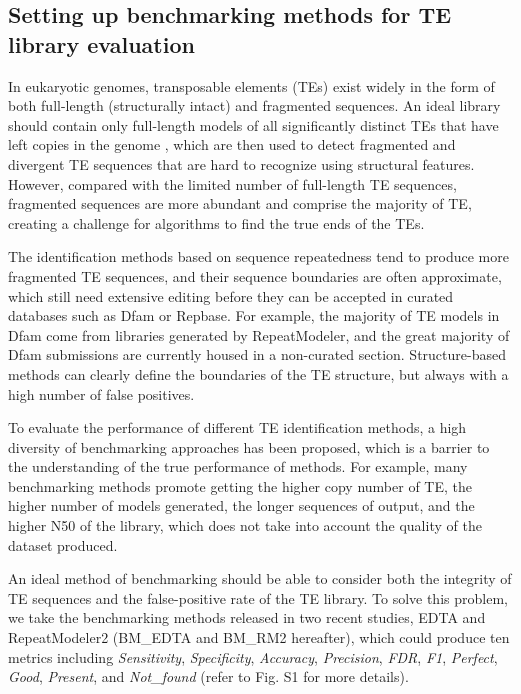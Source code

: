 \documentclass{bmcart}
\begin{document}
\subsection*{Setting up benchmarking methods for TE library evaluation}
In eukaryotic genomes, transposable elements (TEs) exist widely in the form of both full-length (structurally intact) and fragmented sequences. An ideal library should contain only full-length models of all significantly distinct TEs that have left copies in the genome \cite{storer2022methodologies}, which are then used to detect fragmented and divergent TE sequences that are hard to recognize using structural features. However, compared with the limited number of full-length TE sequences, fragmented sequences are more abundant and comprise the majority of TE, creating a challenge for algorithms to find the true ends of the TEs.

The identification methods based on sequence repeatedness tend to produce more fragmented TE sequences, and their sequence boundaries are often approximate, which still need extensive editing before they can be accepted in curated databases such as Dfam or Repbase. For example, the majority of TE models in Dfam come from libraries generated by RepeatModeler, and the great majority of Dfam submissions are currently housed in a non-curated section\cite{storer2021dfam}. Structure-based methods can clearly define the boundaries of the TE structure, but always with a high number of false positives.

To evaluate the performance of different TE identification methods, a high diversity of benchmarking approaches has been proposed, which is a barrier to the understanding of the true performance of methods. For example, many benchmarking methods promote getting the higher copy number of TE, the higher number of models generated, the longer sequences of output, and the higher N50 of the library, which does not take into account the quality of the dataset produced\cite{storer2022methodologies}.

An ideal method of benchmarking should be able to consider both the integrity of TE sequences and the false-positive rate of the TE library. To solve this problem, we take the benchmarking methods released in two recent studies, EDTA\cite{ou2019benchmarking} and RepeatModeler2\cite{flynn2020repeatmodeler2} (BM\_EDTA and BM\_RM2 hereafter), which could produce ten metrics including \emph{Sensitivity}, \emph{Specificity}, \emph{Accuracy}, \emph{Precision}, \emph{FDR}, \emph{F1}, \emph{Perfect}, \emph{Good}, \emph{Present}, and \emph{Not\_found} (refer to Fig. S1 for more details).
\end{document}
